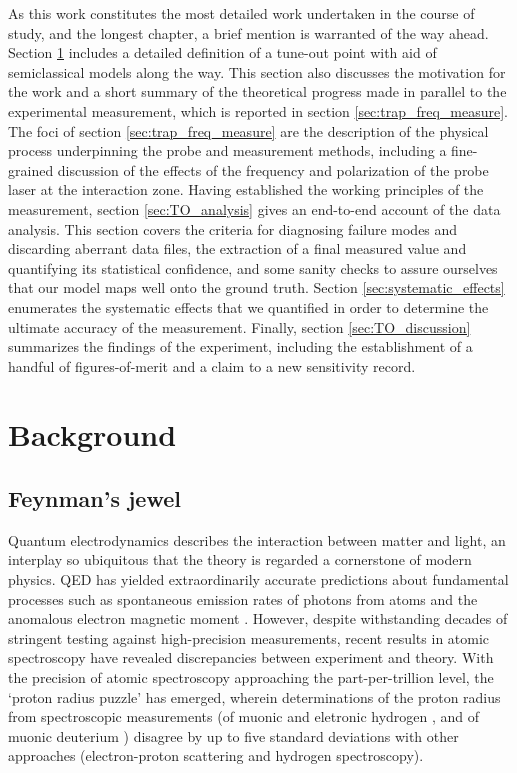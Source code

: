 	As this work constitutes the most detailed work undertaken in the course of study, and the longest chapter, a brief mention is warranted of the way ahead.
	Section \ref{sec:TO_bg} includes a detailed definition of a tune-out point with aid of semiclassical models along the way. This section also discusses the motivation for the work and a short summary of the theoretical progress made in parallel to the experimental measurement, which is reported in section \ref{sec:trap_freq_measure}. The foci of section \ref{sec:trap_freq_measure} are the description of the physical process underpinning the probe and measurement methods, including a fine-grained discussion of the effects of the frequency and polarization of the probe laser at the interaction zone. Having established the working principles of the measurement, section \ref{sec:TO_analysis} gives an end-to-end account of the data analysis. This section covers the criteria for diagnosing failure modes and discarding aberrant data files, the extraction of a final measured value and quantifying its statistical confidence, and some sanity checks to assure ourselves that our model maps well onto the ground truth. Section \ref{sec:systematic_effects} enumerates the systematic effects that we quantified in order to determine the ultimate accuracy of the measurement. Finally, section \ref{sec:TO_discussion} summarizes the findings of the experiment, including the establishment of a handful of figures-of-merit and a claim to a new sensitivity record.

	
\section{Background}
\label{sec:TO_bg}

\subsection*{Feynman's jewel}
	Quantum electrodynamics describes the interaction between matter and light, an interplay so ubiquitous that the theory is regarded a cornerstone of modern physics.
	QED has yielded extraordinarily accurate predictions about fundamental processes such as spontaneous emission rates of photons from atoms and the anomalous electron magnetic moment \cite{Aoyama15}.
	However, despite withstanding decades of stringent testing against high-precision measurements, recent results in atomic spectroscopy have revealed discrepancies between experiment and theory.  
	With the precision of atomic spectroscopy approaching the part-per-trillion level, the `proton radius puzzle' has emerged, wherein determinations of the proton radius from spectroscopic measurements (of muonic \cite{Pohl10} and eletronic hydrogen \cite{Bezginov19,Beyer17}, and of muonic deuterium \cite{Pohl16}) disagree by up to five standard deviations with other approaches (electron-proton scattering \cite{Zhan11} and hydrogen spectroscopy\cite{Fleurbaey18}). 


